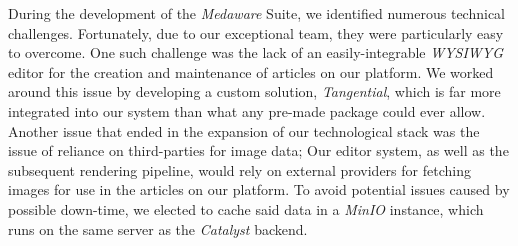 During the development of the \textit{Medaware} Suite, we identified numerous technical challenges. Fortunately, due to
our exceptional team, they were particularly easy to overcome.
One such challenge was the lack of an easily-integrable \textit{WYSIWYG} editor for the creation and maintenance of
articles on our platform. We worked around this issue by developing a custom solution, \textit{Tangential}, which is far more
integrated into our system than what any pre-made package could ever allow.
Another issue that ended in the expansion of our technological stack was the issue of reliance on third-parties for image
data; Our editor system, as well as the subsequent rendering pipeline, would rely on external providers for fetching images
for use in the articles on our platform. To avoid potential issues caused by possible down-time, we elected to cache said
data in a \textit{MinIO} instance, which runs on the same server as the \textit{Catalyst} backend.
